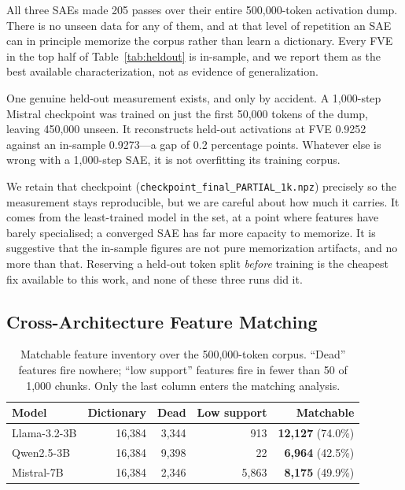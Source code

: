 \documentclass[11pt]{article}
\begin{document}
All three SAEs made 205 passes over their entire 500{,}000-token activation dump.
There is no unseen data for any of them, and at that level of repetition an SAE can in
principle memorize the corpus rather than learn a dictionary. Every FVE in the top half
of Table~\ref{tab:heldout} is in-sample, and we report them as the best available
characterization, not as evidence of generalization.

One genuine held-out measurement exists, and only by accident. A 1{,}000-step Mistral
checkpoint was trained on just the first 50{,}000 tokens of the dump, leaving 450{,}000
unseen. It reconstructs held-out activations at FVE 0.9252 against an in-sample
0.9273---a gap of 0.2 percentage points. Whatever else is wrong with a 1{,}000-step SAE,
it is not overfitting its training corpus.

We retain that checkpoint (\texttt{checkpoint\_final\_PARTIAL\_1k.npz}) precisely so the
measurement stays reproducible, but we are careful about how much it carries. It comes
from the least-trained model in the set, at a point where features have barely
specialised; a converged SAE has far more capacity to memorize. It is suggestive that
the in-sample figures are not pure memorization artifacts, and no more than that.
Reserving a held-out token split \emph{before} training is the cheapest fix available
to this work, and none of these three runs did it.

\subsection{Cross-Architecture Feature Matching}
\label{sec:matching}

\begin{table}[t]
  \centering
  \caption{Matchable feature inventory over the 500{,}000-token corpus. ``Dead'' features
    fire nowhere; ``low support'' features fire in fewer than 50 of 1{,}000 chunks.
    Only the last column enters the matching analysis.}
  \label{tab:inventory}
  \smallskip
  \begin{tabular}{lrrrr}
    \toprule
    Model & Dictionary & Dead & Low support & \textbf{Matchable} \\
    \midrule
    Llama-3.2-3B & 16{,}384 & 3{,}344 &    913 & \textbf{12{,}127} (74.0\%) \\
    Qwen2.5-3B   & 16{,}384 & 9{,}398 &     22 & \textbf{6{,}964} (42.5\%) \\
    Mistral-7B   & 16{,}384 & 2{,}346 & 5{,}863 & \textbf{8{,}175} (49.9\%) \\
    \bottomrule
  \end{tabular}
\end{table}
\end{document}
